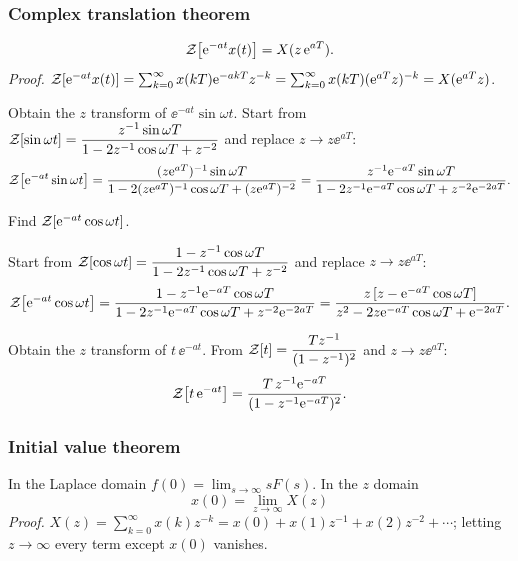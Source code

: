 \subsubsection*{Complex translation theorem}
\[
  \mathcal{Z}\!\left[\mathrm{e}^{-at}x(t)\right]=X(z\,\mathrm{e}^{aT}).
\]
\emph{Proof.} $\mathcal{Z}\!\left[\mathrm{e}^{-at}x(t)\right]=\sum_{k=0}^{\infty}x(kT)\mathrm{e}^{-akT}z^{-k}=\sum_{k=0}^{\infty}x(kT)(\mathrm{e}^{aT}z)^{-k}=X(\mathrm{e}^{aT}z)$.

\begin{example}
Obtain the $z$ transform of $\ee^{-at}\sin\omega t$. Start from
$\mathcal{Z}\!\left[\sin\omega t\right]=\dfrac{z^{-1}\sin\omega T}{1-2z^{-1}\cos\omega T+z^{-2}}$ and replace $z\to z\ee^{aT}$:
\[
  \mathcal{Z}\!\left[\mathrm{e}^{-at}\sin\omega t\right]=\frac{(z\mathrm{e}^{aT})^{-1}\sin\omega T}{1-2(z\mathrm{e}^{aT})^{-1}\cos\omega T+(z\mathrm{e}^{aT})^{-2}}
  =\frac{z^{-1}\mathrm{e}^{-aT}\sin\omega T}{1-2z^{-1}\mathrm{e}^{-aT}\cos\omega T+z^{-2}\mathrm{e}^{-2aT}}.
\]
\end{example}

\begin{bexercise}
Find $\mathcal{Z}\!\left[\mathrm{e}^{-at}\cos\omega t\right]$.
\end{bexercise}
\begin{addsol}
Start from $\mathcal{Z}\!\left[\cos\omega t\right]=\dfrac{1-z^{-1}\cos\omega T}{1-2z^{-1}\cos\omega T+z^{-2}}$ and replace $z\to z\ee^{aT}$:
\[
  \mathcal{Z}\!\left[\mathrm{e}^{-at}\cos\omega t\right]=\frac{1-z^{-1}\mathrm{e}^{-aT}\cos\omega T}{1-2z^{-1}\mathrm{e}^{-aT}\cos\omega T+z^{-2}\mathrm{e}^{-2aT}}
  =\frac{z\,[z-\mathrm{e}^{-aT}\cos\omega T]}{z^{2}-2z\mathrm{e}^{-aT}\cos\omega T+\mathrm{e}^{-2aT}}.
\]
\end{addsol}

\begin{example}
Obtain the $z$ transform of $t\,\ee^{-at}$. From $\mathcal{Z}\!\left[t\right]=\dfrac{Tz^{-1}}{(1-z^{-1})^{2}}$ and $z\to z\ee^{aT}$:
\[
  \mathcal{Z}\!\left[t\,\mathrm{e}^{-at}\right]=\frac{T\,z^{-1}\mathrm{e}^{-aT}}{(1-z^{-1}\mathrm{e}^{-aT})^{2}}.
\]
\end{example}

\subsubsection*{Initial value theorem}
In the Laplace domain $f(0)=\lim_{s\to\infty}sF(s)$. In the $z$ domain
\begin{equation}
  \boxed{\,x(0)=\lim_{z\to\infty}X(z)\,}
\end{equation}
\emph{Proof.} $X(z)=\sum_{k=0}^{\infty}x(k)z^{-k}=x(0)+x(1)z^{-1}+x(2)z^{-2}+\cdots$; letting $z\to\infty$ every
term except $x(0)$ vanishes.

